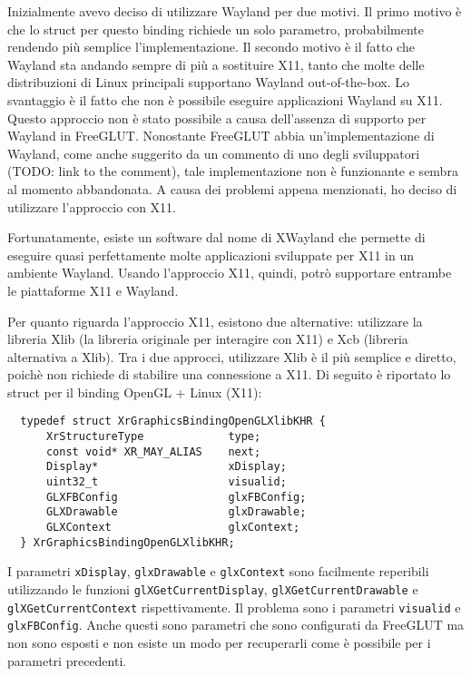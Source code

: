 \documentclass[twoside]{supsistudent}
\begin{document}
Inizialmente avevo deciso di utilizzare Wayland per due motivi. Il primo motivo è che lo struct per questo binding richiede un solo parametro, probabilmente rendendo più semplice l'implementazione. Il secondo motivo è il fatto che Wayland sta andando sempre di più a sostituire X11, tanto che molte delle distribuzioni di Linux principali supportano Wayland out-of-the-box. Lo svantaggio è il fatto che non è possibile eseguire applicazioni Wayland su X11. Questo approccio non è stato possibile a causa dell'assenza di supporto per Wayland in FreeGLUT. Nonostante FreeGLUT abbia un'implementazione di Wayland, come anche suggerito da un commento di uno degli sviluppatori (TODO: link to the comment), tale implementazione non è funzionante e sembra al momento abbandonata. A causa dei problemi appena menzionati, ho deciso di utilizzare l'approccio con X11.

Fortunatamente, esiste un software dal nome di XWayland che permette di eseguire quasi perfettamente molte applicazioni sviluppate per X11 in un ambiente Wayland. Usando l'approccio X11, quindi, potrò supportare entrambe le piattaforme X11 e Wayland.

Per quanto riguarda l'approccio X11, esistono due alternative: utilizzare la libreria Xlib (la libreria originale per interagire con X11) e Xcb (libreria alternativa a Xlib). Tra i due approcci, utilizzare Xlib è il più semplice e diretto, poichè non richiede di stabilire una connessione a X11. Di seguito
è riportato lo struct per il binding OpenGL + Linux (X11):

\begin{verbatim}
  typedef struct XrGraphicsBindingOpenGLXlibKHR {
      XrStructureType             type;
      const void* XR_MAY_ALIAS    next;
      Display*                    xDisplay;
      uint32_t                    visualid;
      GLXFBConfig                 glxFBConfig;
      GLXDrawable                 glxDrawable;
      GLXContext                  glxContext;
  } XrGraphicsBindingOpenGLXlibKHR;
\end{verbatim}

I parametri \texttt{xDisplay}, \texttt{glxDrawable} e \texttt{glxContext} sono facilmente reperibili utilizzando le funzioni \texttt{glXGetCurrentDisplay}, \texttt{glXGetCurrentDrawable} e \texttt{glXGetCurrentContext} rispettivamente. Il problema sono i parametri \texttt{visualid} e \texttt{glxFBConfig}. Anche questi sono parametri che sono configurati da FreeGLUT ma non sono esposti e non esiste un modo per recuperarli come è possibile per i parametri precedenti.
\end{document}
